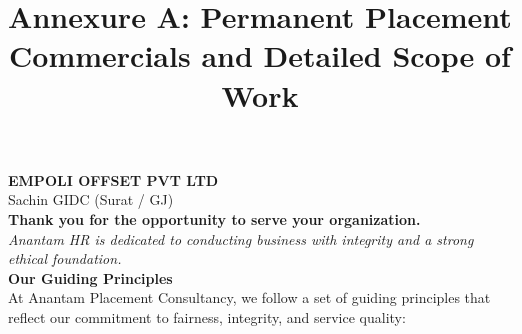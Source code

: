 \documentclass{article}
\title{\textbf{\color{primary} Annexure A: Permanent Placement Commercials and Detailed Scope of Work}}
\date{}
\begin{document}
\maketitle

\noindent\textbf{EMPOLI OFFSET PVT LTD}\\
Sachin GIDC (Surat / GJ)\\[1em]

\noindent\textbf{Thank you for the opportunity to serve your organization.}\\[0.5em]
\noindent\textit{Anantam HR is dedicated to conducting business with integrity and a strong ethical foundation.}\\[1em]

\noindent\textbf{\color{secondary} Our Guiding Principles}\\[0.5em]
\noindent At Anantam Placement Consultancy, we follow a set of guiding principles that reflect our commitment to fairness, integrity, and service quality:
\end{document}
